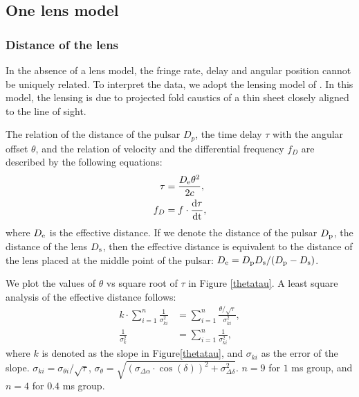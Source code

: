 \documentclass[useAMS,usenatbib]{mn2e}
\begin{document}
\subsection{One lens model}
\subsubsection{Distance of the lens}
In the absence of a lens model, the
fringe rate, delay and angular position cannot be uniquely related. To interpret the data, we adopt the lensing model of
\citep{2014MNRAS.442.3338P}.  In this model, the lensing is due to projected fold caustics of a thin sheet closely aligned to the line of sight. 

The relation of the distance of the pulsar $D_p$, the time delay $\tau$ with the angular offset $\theta$, and the relation of velocity and the differential frequency $f_D$ are described by the following equations:
\begin{equation}
\begin{aligned}
\tau &=\frac{D_{\rm e}{\theta}^2}{2c}, \\
f_D  &=f\cdot\frac{\rm d\tau}{\rm dt},
\end{aligned} 
\end{equation}
where ${D_{\rm e}}$ is the effective distance. If we denote the distance of the pulsar $D_{\rm p}$, the distance of the lens $D_{\rm s}$, then the effective distance is equivalent to the distance of the lens placed at the middle point of the pulsar: $D_{\rm e}={D_{\rm p} D_{\rm s}}/({D_{\rm p} - D_{\rm s}})$. 

We plot the values of $\theta$ vs square root of $\tau$ in Figure \ref{thetatau}. A least square analysis of the effective distance follows:
\begin{equation}
\begin{aligned}
k\cdot{\sum\limits_{i=1}^n\frac{1}{\sigma_{ki}^2}}&=\sum\limits_{i=1}^n\frac{\theta/\sqrt{\tau}}{\sigma_{ki}^2},\\
\frac{1}{\sigma_k^2}&=\sum\limits_{i=1}^n\frac{1}{\sigma_{ki}^2},
\end{aligned}
\end{equation}
where $k$ is denoted as the slope in Figure\ref{thetatau}, and $\sigma_{ki}$ as the error of the slope. $\sigma_{ki}=\sigma_{\theta i}/\sqrt{\tau}$, $\sigma_{\theta}=\sqrt{(\sigma_{\Delta\alpha}\cdot{\cos(\delta)})^2+\sigma_{\Delta\delta}^2}$. $n=9$ for $1$ ms group, and $n=4$ for $0.4$ ms group. 
\end{document}
